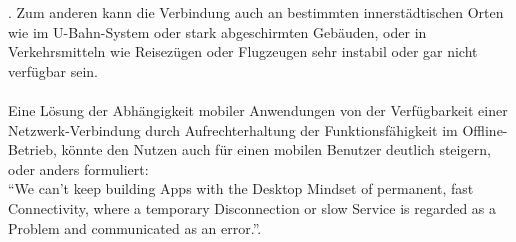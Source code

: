 \addtocounter{footnote}{1}%
.
Zum anderen kann die Verbindung auch an bestimmten innerstädtischen Orten wie im U-Bahn-System oder stark abgeschirmten Gebäuden, oder in Verkehrsmitteln wie Reisezügen oder Flugzeugen sehr instabil oder gar nicht verfügbar sein.\\ \\
\noindent
Eine Lösung der Abhängigkeit mobiler Anwendungen von der Verfügbarkeit einer Netzwerk-Verbindung durch Aufrechterhaltung der Funktionsfähigkeit im Offline-Betrieb, könnte den Nutzen auch für einen mobilen Benutzer deutlich steigern, oder anders formuliert:\\
"`We can’t keep building Apps with the Desktop Mindset of permanent, fast Connectivity, where a temporary Disconnection or slow Service is regarded as a Problem and communicated as an error."'\cite{OFFLFIRST:WWW}.
	
